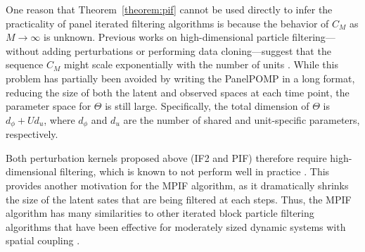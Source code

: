 One reason that Theorem~\ref{theorem:pif} cannot be used directly to infer the practicality of panel iterated filtering algorithms is because the behavior of $C_M$ as $M \rightarrow \infty$ is unknown.
Previous works on high-dimensional particle filtering---without adding perturbations or performing data cloning---suggest that the sequence $C_M$ might scale exponentially with the number of units \citep{snyder08,bengtsson08}.
While this problem has partially been avoided by writing the PanelPOMP in a long format, reducing the size of both the latent and observed spaces at each time point, the parameter space for $\Theta$ is still large.
Specifically, the total dimension of $\Theta$ is $d_\phi + Ud_u$, where $d_\phi$ and $d_u$ are the number of shared and unit-specific parameters, respectively.

Both perturbation kernels proposed above (IF2 and PIF) therefore require high-dimensional filtering, which is known to not perform well in practice \citep{rebeschini15}.
This provides another motivation for the MPIF algorithm, as it dramatically shrinks the size of the latent sates that are being filtered at each steps. 
Thus, the MPIF algorithm has many similarities to other iterated block particle filtering algorithms that have been effective for moderately sized dynamic systems with spatial coupling \citep{ning23,ionides24}.
